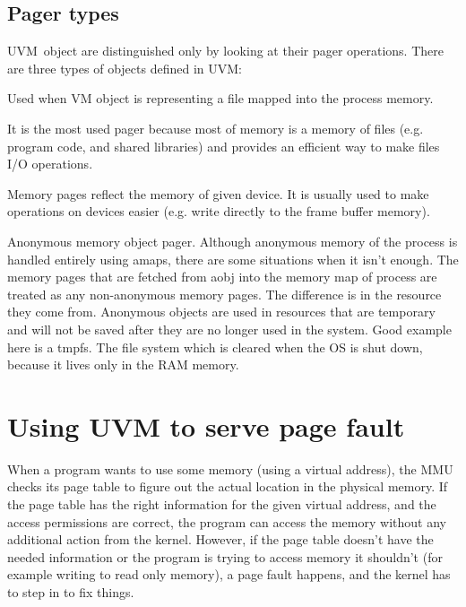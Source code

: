 \subsection{Pager types}

UVM~object are distinguished only by looking at their pager operations.
There are three types of objects defined in UVM:

\begin{description}[style=nextline]
  \item[Vnode pager]
    Used when VM object is representing a file mapped into the process memory.

    It is the most used pager because most of memory is a memory of files (e.g. program code, and shared libraries)
    and provides an efficient way to make files I/O operations.

  \item[Device pager]
    Memory pages reflect the memory of given device.
    It is usually used to make operations on devices easier (e.g. write directly to the frame buffer memory).

  \item[Aobj pager]
    Anonymous memory object pager.
    Although anonymous memory of the process is handled entirely using amaps, there are some situations when it isn't enough.
    The memory pages that are fetched from aobj into the memory map of process are treated as any non-anonymous memory pages.
    The difference is in the resource they come from.
    Anonymous objects are used in resources that are temporary and will not be saved after they are no longer used in the system.
    Good example here is a tmpfs.
    The file system which is cleared when the OS is shut down, because it lives only in the RAM memory.

\end{description}

\section{Using UVM to serve page fault}
\label{uvm:page_fault}

When a program wants to use some memory (using a virtual address), the MMU checks its page table to figure out the actual location in the physical memory.
If the page table has the right information for the given virtual address, and the access permissions are correct,
the program can access the memory without any additional action from the kernel.
However, if the page table doesn't have the needed information or the program is trying to access memory it shouldn't (for example writing to read only memory),
a page fault happens, and the kernel has to step in to fix things.

